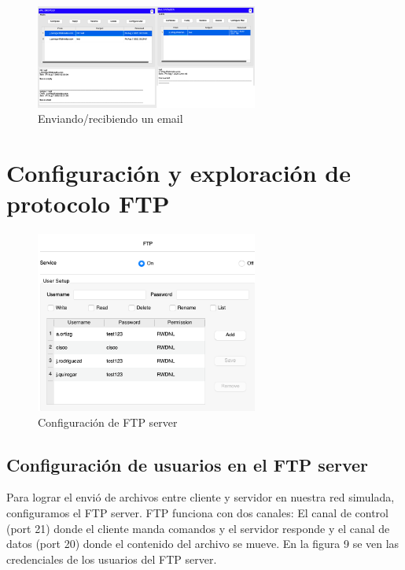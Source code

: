 \documentclass[10pt]{article}
\begin{document}
\begin{figure}[H]
    \centering
    \includegraphics[width=0.65\textwidth]{lab-01-screenshots/45-4-send-receive.png}
    \caption{Enviando/recibiendo un email}
\end{figure}


\section{Configuración y exploración de protocolo FTP}

\begin{figure}[H]
    \centering
    \includegraphics[width=0.65\textwidth]{lab-01-screenshots/46-1-ftp-config}
    \caption{Configuración de FTP server}
\end{figure}

\subsection{Configuración de usuarios en el FTP server}

Para lograr el envió de archivos entre cliente y servidor en nuestra red simulada, configuramos el FTP server. FTP funciona con dos canales: El canal de control (port 21) donde el cliente manda comandos y el servidor responde y el canal de datos (port 20) donde el contenido del archivo se mueve. En la figura 9 se ven las credenciales de los usuarios del FTP server.
\end{document}
